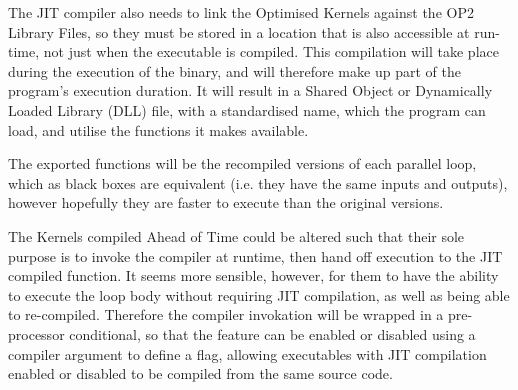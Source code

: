 \begin{figure}[h!]
{{
  }}
\end{figure}

The JIT compiler also needs to link the Optimised Kernels against the OP2 Library Files, so they must be stored in a location that is also accessible at run-time, not just when the executable is compiled. This compilation will take place during the execution of the binary, and will therefore make up part of the program's execution duration. It will result in a Shared Object or Dynamically Loaded Library (DLL) file, with a standardised name, which the program can load, and utilise the functions it makes available.
\par
The exported functions will be the recompiled versions of each parallel loop, which as black boxes are equivalent (i.e. they have the same inputs and outputs), however hopefully they are faster to execute than the original versions.
\par
The Kernels compiled Ahead of Time could be altered such that their sole purpose is to invoke the compiler at runtime, then hand off execution to the JIT compiled function. It seems more sensible, however, for them to have the ability to execute the loop body without requiring JIT compilation, as well as being able to re-compiled. Therefore the compiler invokation will be wrapped in a pre-processor conditional, so that the feature can be enabled or disabled using a compiler argument to define a flag, allowing executables with JIT compilation enabled or disabled to be compiled from the same source code.

